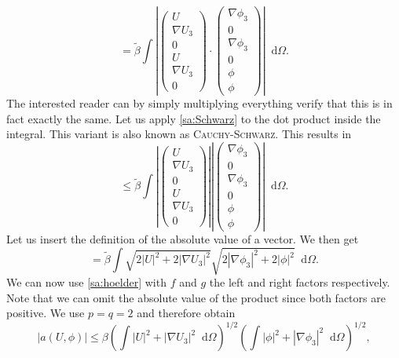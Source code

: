 \documentclass[12pt,a4paper,twoside, open=right]{scrreprt}
\theoremstyle{definition}
\theoremstyle{plain}
\newcommand{\abs}[1]{\left\vert #1\right\vert}
\newcommand{\D}{\mathop{}\!\mathrm{d}}
\begin{document}
\begin{equation}
    =\tilde\beta\int\abs{\begin{pmatrix}
        U\\\nabla U_3\\0\\U\\\nabla U_3\\0
        \end{pmatrix}\cdot\begin{pmatrix}
        \nabla\phi_3\\0\\\nabla\phi_3\\0\\\phi\\\phi
        \end{pmatrix}}\D\Omega.
\end{equation}
The interested reader can by simply multiplying everything verify that this is in fact exactly the same. Let us apply \ref{sa:Schwarz} to the dot product inside the integral. This variant is also known as \textsc{Cauchy-Schwarz}. This results in 
\begin{equation}
   \le\tilde\beta\int\abs{\begin{pmatrix}
       U\\\nabla U_3\\0\\U\\\nabla U_3\\0
       \end{pmatrix}}\abs{\begin{pmatrix}
   \nabla\phi_3\\0\\\nabla\phi_3\\0\\\phi\\\phi
\end{pmatrix}}\D\Omega.
\end{equation} 
Let us insert the definition of the absolute value of a vector. We then get
\begin{equation}
    =\tilde\beta\int\sqrt{2\abs{U}^2+2\abs{\nabla U_3}^2}\sqrt{2\abs{\nabla\phi_3}^2+2\abs{\phi}^2}\D\Omega.
\end{equation}
We can now use \ref{sa:hoelder} with $f$ and $g$ the left and right factors respectively. Note that we can omit the absolute value of the product since both factors are positive. We use $p=q=2$ and therefore obtain
\begin{equation}
    \abs{a(U,\phi)}\le\beta\left(\int\abs{U}^2+\abs{\nabla U_3}^2\D\Omega \right)^{1/2}\left(\int\abs{\phi}^2+\abs{\nabla\phi_3}^2\D\Omega\right)^{1/2},
\end{equation} 
\end{document}
